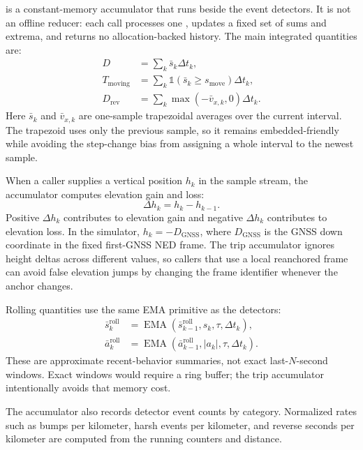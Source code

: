 \documentclass[11pt]{article}
\newcommand{\dt}{\Delta t}
\newcommand{\abs}[1]{\left|#1\right|}
\begin{document}
 is a constant-memory accumulator that runs beside the event
detectors. It is not an offline reducer: each call processes one
, updates a fixed set of sums and extrema, and returns no
allocation-backed history. The main integrated quantities are:
\begin{align}
  D &= \sum_k \bar{s}_k\dt_k,\\
  T_{\mathrm{moving}} &= \sum_k \mathbb{1}(\bar{s}_k \ge s_{\mathrm{move}})\dt_k,\\
  D_{\mathrm{rev}} &= \sum_k \max(-\bar{v}_{x,k},0)\dt_k.
\end{align}
Here \(\bar{s}_k\) and \(\bar{v}_{x,k}\) are one-sample trapezoidal averages
over the current interval. The trapezoid uses only the previous sample, so it
remains embedded-friendly while avoiding the step-change bias from assigning a
whole interval to the newest sample.

When a caller supplies a vertical position \(h_k\) in the sample stream, the
accumulator computes elevation gain and loss:
\begin{equation}
  \Delta h_k = h_k - h_{k-1}.
\end{equation}
Positive \(\Delta h_k\) contributes to elevation gain and negative \(\Delta h_k\)
contributes to elevation loss. In the simulator, \(h_k=-D_{\mathrm{GNSS}}\),
where \(D_{\mathrm{GNSS}}\) is the GNSS down coordinate in the fixed first-GNSS
NED frame. The trip accumulator ignores height deltas across different
 values, so callers that use a local reanchored frame can
avoid false elevation jumps by changing the frame identifier whenever the
anchor changes.

Rolling quantities use the same EMA primitive as the detectors:
\begin{align}
  \bar{s}^{\mathrm{roll}}_k
    &= \operatorname{EMA}(\bar{s}^{\mathrm{roll}}_{k-1}, s_k,\tau,\dt_k),\\
  \bar{a}^{\mathrm{roll}}_k
    &= \operatorname{EMA}(\bar{a}^{\mathrm{roll}}_{k-1}, \abs{a_k},\tau,\dt_k).
\end{align}
These are approximate recent-behavior summaries, not exact last-\(N\)-second
windows. Exact windows would require a ring buffer; the trip accumulator
intentionally avoids that memory cost.

The accumulator also records detector event counts by category. Normalized
rates such as bumps per kilometer, harsh events per kilometer, and reverse
seconds per kilometer are computed from the running counters and distance.
\end{document}
